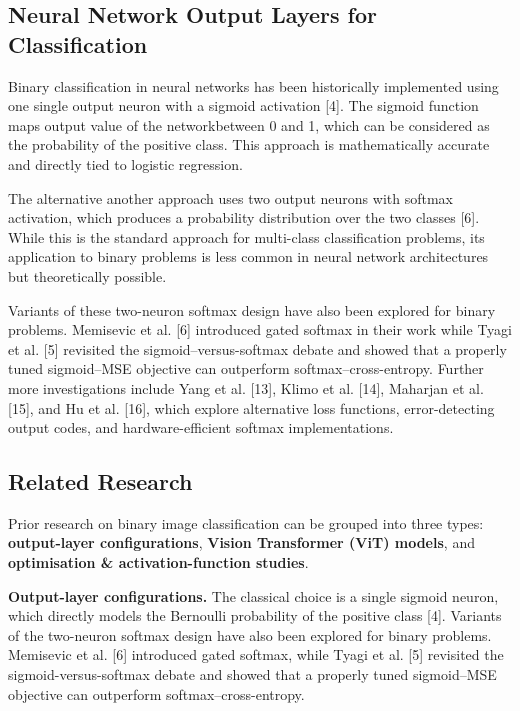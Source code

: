 \documentclass[11pt]{article}
\begin{document}
\subsection{Neural Network Output Layers for Classification}
Binary classification in neural networks has been historically implemented using one single output neuron with a  sigmoid activation [4]. The sigmoid function maps  output value of the networkbetween 0 and 1, which can be considered as the probability of the positive class. This approach is mathematically accurate and directly tied to logistic regression.

The alternative another approach uses two output neurons with softmax activation, which produces a probability distribution over the two classes [6]. While this is the standard approach for multi-class classification problems, its application to binary problems is less common in neural network architectures but theoretically possible.

Variants of these two-neuron softmax design have also been explored for binary problems. Memisevic et al. [6] introduced gated softmax in their work while Tyagi et al. [5] revisited the sigmoid–versus-softmax debate and showed that a properly tuned sigmoid–MSE objective can outperform softmax–cross-entropy. Further more investigations include Yang et al. [13], Klimo et al. [14], Maharjan et al. [15], and Hu et al. [16], which explore alternative loss functions, error-detecting output codes, and hardware-efficient softmax implementations.

\subsection{Related Research}
Prior research on binary image classification can be grouped into three types: \textbf{output-layer configurations}, \textbf{Vision Transformer (ViT) models}, and \textbf{optimisation \& activation-function studies}.

\textbf{Output-layer configurations.} The classical choice is a single sigmoid neuron, which directly models the Bernoulli probability of the positive class [4]. Variants of the two-neuron softmax design have also been explored for binary problems. Memisevic et al. [6] introduced gated softmax, while Tyagi et al. [5] revisited the sigmoid-versus-softmax debate and showed that a properly tuned sigmoid–MSE objective can outperform softmax–cross-entropy.
\end{document}
